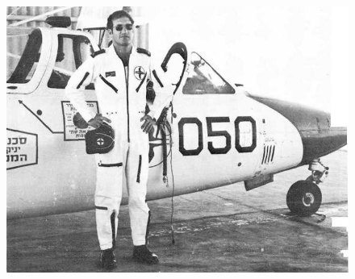 \begin{figure}[h!tb] 
	\centering\includegraphics[scale=0.6]{History_Yosya/M8BDQOT5FmA.jpg}
\end{figure}

